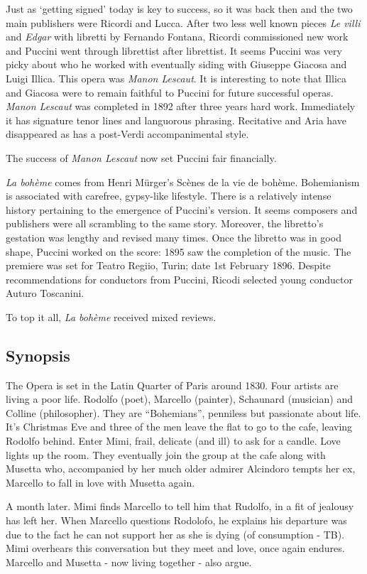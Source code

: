 Just as `getting signed' today is key to success, so it was back then and the two main publishers were Ricordi and Lucca. After two less well known pieces \textit{Le villi} and \textit{Edgar} with libretti by Fernando Fontana, Ricordi commissioned new work and Puccini went through librettist after librettist. It seems Puccini was very picky about who he worked with eventually siding with Giuseppe Giacosa and Luigi Illica. This opera was \textit{Manon Lescaut}. It is interesting to note that Illica and Giacosa were to remain faithful to Puccini for future successful operas. \textit{Manon Lescaut} was completed in 1892 after three years hard work. Immediately it has signature tenor lines and languorous phrasing. Recitative and Aria have disappeared as has a post-Verdi accompanimental style. 

The success of \textit{Manon Lescaut} now set Puccini fair financially. 

\textit{La boh\`eme} comes from Henri M\"urger's Sc\`enes de la vie de boh\`eme. Bohemianism is associated with carefree, gypsy-like lifestyle. There is a relatively intense history pertaining to the emergence of Puccini's version. It seems composers and publishers were all scrambling to the same story. Moreover, the libretto's gestation was lengthy and revised many times. Once the libretto was in good shape, Puccini worked on the score: 1895 saw the completion of the music. The premiere was set for Teatro Regiio, Turin; date 1st February 1896. Despite recommendations for conductors from Puccini, Ricodi selected young conductor Auturo Toscanini.

To top it all, \textit{La boh\`eme} received mixed reviews. 

\subsection{Synopsis}
The Opera is set in the Latin Quarter of Paris around 1830. Four artists are living a poor life. Rodolfo (poet), Marcello (painter), Schaunard (musician) and Colline (philosopher). They are ``Bohemians'', penniless but passionate about life. It's Christmas Eve and three of the men leave the flat to go to the cafe, leaving Rodolfo behind. Enter Mimi, frail, delicate (and ill) to ask for a candle. Love lights up the room. They eventually join the group at the cafe along with Musetta who, accompanied by her much older admirer Alcindoro tempts her ex, Marcello to fall in love with Musetta again. 

A month later. Mimi finds Marcello to tell him that Rudolfo, in a fit of jealousy has left her. When Marcello questions Rodolofo, he explains his departure was due to the fact he can not support her as she is dying (of consumption - TB). Mimi overhears this conversation but they meet and love, once again endures. Marcello and Musetta - now living together - also argue. 

